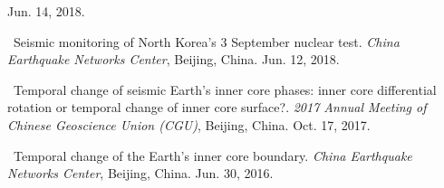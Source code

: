 \begin{etaremune}
    Jun. 14, 2018.
\item
    \Yao\
    Seismic monitoring of North Korea's 3 September nuclear test.
    \textit{China Earthquake Networks Center}, Beijing, China.
    Jun. 12, 2018.
\item
    \Yao\
    Temporal change of seismic Earth's inner core phases: inner core differential rotation or temporal change of inner core surface?.
    \textit{2017 Annual Meeting of Chinese Geoscience Union (CGU)}, Beijing, China.
    Oct. 17, 2017.
    \invited
\item
    \Yao\
    Temporal change of the Earth's inner core boundary.
    \textit{China Earthquake Networks Center}, Beijing, China.
    Jun. 30, 2016.
    \invited
\end{etaremune}
